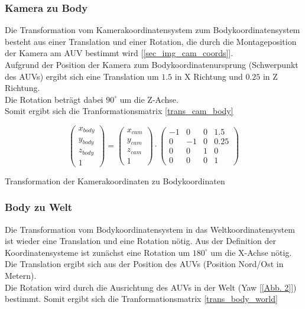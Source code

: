 \subsubsection{Kamera zu Body}
Die Transformation vom Kamerakoordinatensystem zum Bodykoordinatensystem besteht aus einer Translation und einer Rotation, die durch die Montageposition der Kamera am AUV bestimmt wird [\ref{sec_img_cam_coords}].\\
Aufgrund der Position der Kamera zum Bodykoordinatenursprung (Schwerpunkt des AUVs) ergibt sich eine Translation um $1.5$ in X Richtung und $0.25$ in Z Richtung.\\
Die Rotation beträgt dabei $90^\circ$ um die Z-Achse.\\
Somit ergibt sich die Tranformationsmatrix \ref{trans_cam_body}\\

\begin{ownequation}[H]
\begin{equation}
\begin{pmatrix}
x_{body}\\y_{body}\\z_{body}\\1
\end{pmatrix}
=
\begin{pmatrix}
x_{cam}\\y_{cam}\\z_{cam}\\1
\end{pmatrix}
\cdot
\begin{pmatrix}
-1 & 0 & 0& 1.5\\
0 & -1 & 0& 0.25\\
0 & 0 & 1& 0\\
0 & 0 & 0 & 1
\end{pmatrix}
\end{equation}
\caption{Transformation der Kamerakoordinaten zu Bodykoordinaten}
\label{trans_cam_body}
\end{ownequation}

\subsubsection{Body zu Welt}
Die Transformation vom Bodykoordinatensystem in das Weltkoordinatensystem ist wieder eine Translation und eine Rotation nötig.
Aus der Definition der Koordinatensysteme ist zunächst eine Rotation um $180^\circ$ um die X-Achse nötig.
Die Translation ergibt sich aus der Position des AUVs (Position Nord/Ost in Metern).\\
Die Rotation wird durch die Ausrichtung des AUVs in der Welt (Yaw [\ref{Abb. 2}]) bestimmt. Somit ergibt sich die Tranformationsmatrix \ref{trans_body_world}\\

